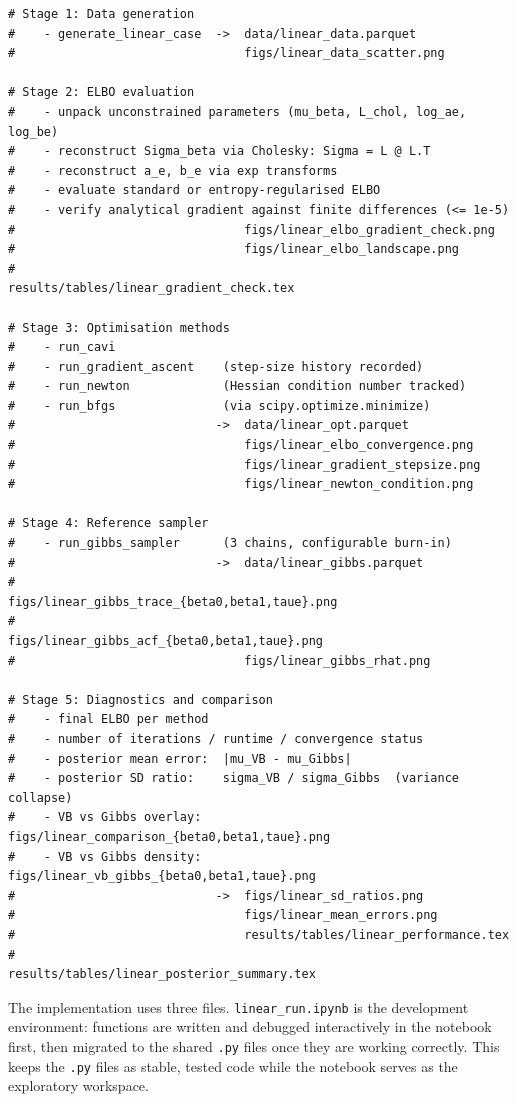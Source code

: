 \documentclass[11pt,a4paper]{article}
\begin{document}
\begin{verbatim}
# Stage 1: Data generation
#    - generate_linear_case  ->  data/linear_data.parquet
#                                figs/linear_data_scatter.png

# Stage 2: ELBO evaluation
#    - unpack unconstrained parameters (mu_beta, L_chol, log_ae, log_be)
#    - reconstruct Sigma_beta via Cholesky: Sigma = L @ L.T
#    - reconstruct a_e, b_e via exp transforms
#    - evaluate standard or entropy-regularised ELBO
#    - verify analytical gradient against finite differences (<= 1e-5)
#                                figs/linear_elbo_gradient_check.png
#                                figs/linear_elbo_landscape.png
#                                results/tables/linear_gradient_check.tex

# Stage 3: Optimisation methods
#    - run_cavi
#    - run_gradient_ascent    (step-size history recorded)
#    - run_newton             (Hessian condition number tracked)
#    - run_bfgs               (via scipy.optimize.minimize)
#                            ->  data/linear_opt.parquet
#                                figs/linear_elbo_convergence.png
#                                figs/linear_gradient_stepsize.png
#                                figs/linear_newton_condition.png

# Stage 4: Reference sampler
#    - run_gibbs_sampler      (3 chains, configurable burn-in)
#                            ->  data/linear_gibbs.parquet
#                                figs/linear_gibbs_trace_{beta0,beta1,taue}.png
#                                figs/linear_gibbs_acf_{beta0,beta1,taue}.png
#                                figs/linear_gibbs_rhat.png

# Stage 5: Diagnostics and comparison
#    - final ELBO per method
#    - number of iterations / runtime / convergence status
#    - posterior mean error:  |mu_VB - mu_Gibbs|
#    - posterior SD ratio:    sigma_VB / sigma_Gibbs  (variance collapse)
#    - VB vs Gibbs overlay:   figs/linear_comparison_{beta0,beta1,taue}.png
#    - VB vs Gibbs density:   figs/linear_vb_gibbs_{beta0,beta1,taue}.png
#                            ->  figs/linear_sd_ratios.png
#                                figs/linear_mean_errors.png
#                                results/tables/linear_performance.tex
#                                results/tables/linear_posterior_summary.tex
\end{verbatim}

The implementation uses three files. \texttt{linear\_run.ipynb} is the development environment:
functions are written and debugged interactively in the notebook first, then migrated to the
shared \texttt{.py} files once they are working correctly. This keeps the \texttt{.py} files
as stable, tested code while the notebook serves as the exploratory workspace.
\end{document}
